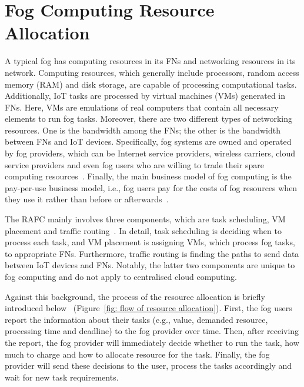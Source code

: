 \documentclass[11pt]{phdthesis}
\begin{document}
\section{Fog Computing Resource Allocation} \label{fog computing resource allocation overview}

A typical fog has computing resources in its FNs and networking resources in its network. Computing resources, which generally include processors, random access memory (RAM) and disk storage, are capable of processing computational tasks. Additionally, IoT tasks are processed by virtual machines (VMs) generated in FNs. Here, VMs are emulations of real computers that contain all necessary elements to run fog tasks. Moreover, there are two different types of networking resources. One is the bandwidth among the FNs; the other is the bandwidth between FNs and IoT devices. Specifically, fog systems are owned and operated by fog providers, which can be Internet service providers, wireless carriers, cloud service providers and even fog users who are willing to trade their spare computing resources~\citep{yi2015survey}. Finally, the main business model of fog computing is the pay-per-use business model, i.e., fog users pay for the costs of fog resources when they use it rather than before or afterwards~\citep{yi2015survey}.

The RAFC mainly involves three components, which are task scheduling, VM placement and traffic routing~\citep{gu2018joint}. In detail, task scheduling is deciding when to process each task, and VM placement is assigning VMs, which process fog tasks, to appropriate FNs. Furthermore, traffic routing is finding the paths to send data between IoT devices and FNs. Notably, the latter two components are unique to fog computing and do not apply to centralised cloud computing. 

Against this background, the process of the resource allocation is briefly introduced below~\citep{shi2017online} (Figure~\ref{fig: flow of resource allocation}). First, the fog users report the information about their tasks (e.g., value, demanded resource, processing time and deadline) to the fog provider over time. Then, after receiving the report, the fog provider will immediately decide whether to run the task, how much to charge and how to allocate resource for the task. Finally, the fog provider will send these decisions to the user, process the tasks accordingly and wait for new task requirements. 
\end{document}
